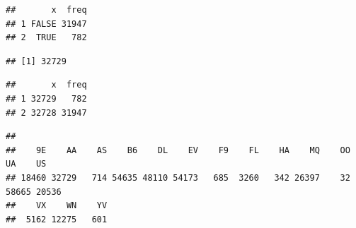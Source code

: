 \documentclass[
]{article}
\newenvironment{Shaded}{\begin{snugshade}}{\end{snugshade}}
\newcommand{\CommentTok}[1]{\textcolor[rgb]{0.56,0.35,0.01}{\textit{#1}}}
\newcommand{\FunctionTok}[1]{\textcolor[rgb]{0.00,0.00,0.00}{#1}}
\newcommand{\NormalTok}[1]{#1}
\newcommand{\OtherTok}[1]{\textcolor[rgb]{0.56,0.35,0.01}{#1}}
\newcommand{\SpecialCharTok}[1]{\textcolor[rgb]{0.00,0.00,0.00}{#1}}
\begin{document}
\begin{Shaded}
\end{Shaded}

\begin{verbatim}
##       x  freq
## 1 FALSE 31947
## 2  TRUE   782
\end{verbatim}

\begin{Shaded}
\end{Shaded}

\begin{verbatim}
## [1] 32729
\end{verbatim}

\begin{Shaded}
\end{Shaded}

\begin{verbatim}
##       x  freq
## 1 32729   782
## 2 32728 31947
\end{verbatim}

\begin{Shaded}
\end{Shaded}

\begin{verbatim}
## 
##    9E    AA    AS    B6    DL    EV    F9    FL    HA    MQ    OO    UA    US 
## 18460 32729   714 54635 48110 54173   685  3260   342 26397    32 58665 20536 
##    VX    WN    YV 
##  5162 12275   601
\end{verbatim}
\end{document}
